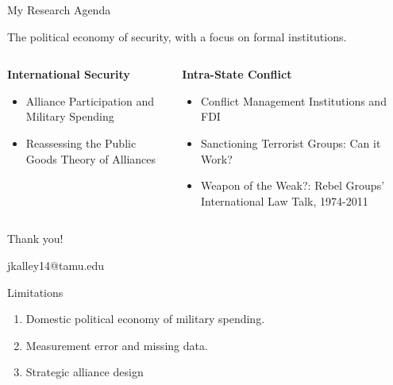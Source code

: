 \documentclass{beamer}
\begin{document}
\begin{frame}{My Research Agenda}

The political economy of security, with a focus on formal institutions. 

\begin{columns}

\begin{column}{0.5\textwidth}
\textbf{International Security}
\begin{itemize} 
\item Alliance Participation and Military Spending 
\item Reassessing the Public Goods Theory of Alliances
\end{itemize} 
\end{column}



\begin{column}{0.5\textwidth}
\textbf{Intra-State Conflict}
\begin{itemize}
\item Conflict Management Institutions and FDI
\item Sanctioning Terrorist Groups: Can it Work?
\item Weapon of the Weak?: Rebel Groups' International Law Talk, 1974-2011
\end{itemize} 
\end{column}

\end{columns}
 

\end{frame}



 \begin{frame}[standout]

Thank you! 

jkalley14@tamu.edu

 \end{frame}



\appendix 



\begin{frame}{Limitations}

\begin{enumerate}
\item Domestic political economy of military spending. 
\pause 
\item Measurement error and missing data. 
\pause 
\item Strategic alliance design
\end{enumerate}

\end{frame}
\end{document}
